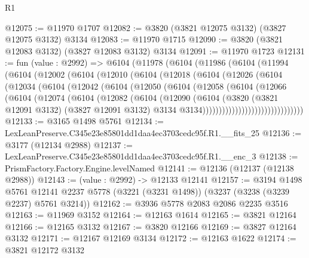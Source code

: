\begin{lexlean}{R1}
\begin{coremodule}
@12075 := @11970 @1707
@12082 := @3820 (@3821 @12075 @3132) (@3827 @12075 @3132) @3134
@12083 := @11970 @1715
@12090 := @3820 (@3821 @12083 @3132) (@3827 @12083 @3132) @3134
@12091 := @11970 @1723
@12131 := fun (value : @2992) =>
  @6104
    (@11978
      (@6104
        (@11986
          (@6104
            (@11994
              (@6104
                (@12002
                  (@6104
                    (@12010
                      (@6104
                        (@12018
                          (@6104
                            (@12026
                              (@6104
                                (@12034
                                  (@6104
                                    (@12042
                                      (@6104
                                        (@12050
                                          (@6104
                                            (@12058
                                              (@6104
                                                (@12066
                                                  (@6104
                                                    (@12074
                                                      (@6104
                                                        (@12082
                                                          (@6104
                                                            (@12090
                                                              (@6104
                                                                (@3820
                                                                  (@3821 @12091 @3132)
                                                                  (@3827 @12091 @3132)
                                                                  @3134
                                                                  @3134)))))))))))))))))))))))))))))))
@12133 := @3165 @1498 @5761
@12134 := LexLeanPreserve.C345e23e85801dd1daa4ec3703cedc95f.R1.__fits_25
@12136 := @3177 (@12134 @2988)
@12137 := LexLeanPreserve.C345e23e85801dd1daa4ec3703cedc95f.R1.__enc_3
@12138 := PrismFactory.Factory.Engine.levelNamed
@12141 := @12136 (@12137 (@12138 @2988))
@12143 := (value : @2992) -> @12133 @12141
@12157 := @3194
    @1498
    @5761
    @12141
    @2237
    @5778
    (@3221 (@3231 @1498))
    (@3237 (@3238 (@3239 @2237) @5761 @3214))
@12162 := @3936 @5778 @2083 @2086 @2235 @3516
@12163 := @11969 @3152
@12164 := @12163 @1614
@12165 := @3821 @12164
@12166 := @12165 @3132
@12167 := @3820 @12166
@12169 := @3827 @12164 @3132
@12171 := @12167 @12169 @3134
@12172 := @12163 @1622
@12174 := @3821 @12172 @3132

\end{coremodule}
\end{lexlean}
